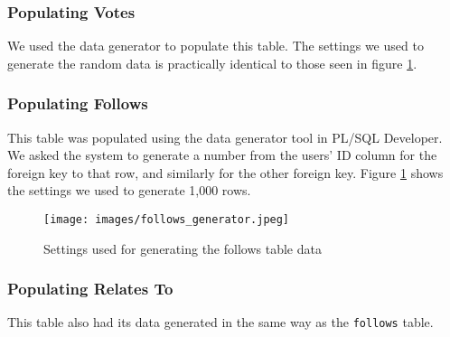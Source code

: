 
\subsubsection{Populating Votes}

We used the data generator to populate this table. The settings we used to generate the random data is practically identical to those seen in figure \ref{follows-generator}.

\subsubsection{Populating Follows}

This table was populated using the data generator tool in PL/SQL Developer. We asked the system to generate a number from the users' ID column for the foreign key to that row, and similarly for the other foreign key. Figure \ref{follows-generator} shows the settings we used to generate 1,000 rows.

\begin{figure}[htbp]
	\centering
	\texttt{[image: images/follows\_generator.jpeg]}
	\caption{Settings used for generating the follows table data}
	\label{follows-generator}
\end{figure}

\subsubsection{Populating Relates To}

This table also had its data generated in the same way as the \verb`follows` table.